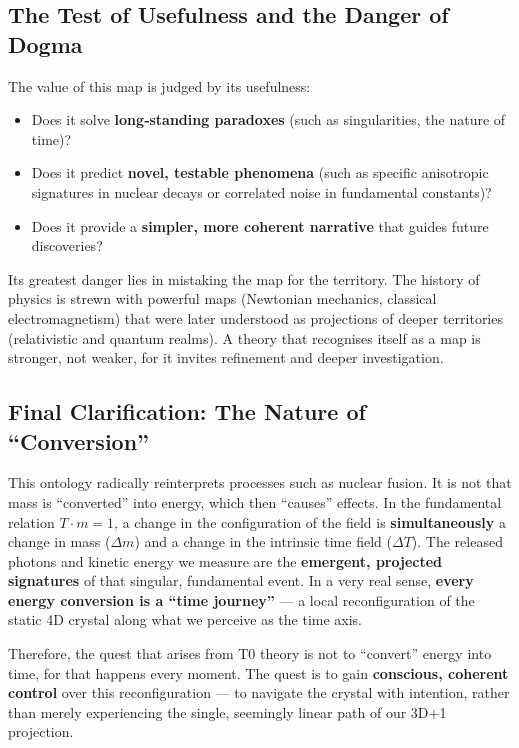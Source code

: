 	\subsection{The Test of Usefulness and the Danger of Dogma}
	
	The value of this map is judged by its usefulness:
	\begin{itemize}
		\item Does it solve \textbf{long‑standing paradoxes} (such as singularities, the nature of time)?
		\item Does it predict \textbf{novel, testable phenomena} (such as specific anisotropic signatures in nuclear decays or correlated noise in fundamental constants)?
		\item Does it provide a \textbf{simpler, more coherent narrative} that guides future discoveries?
	\end{itemize}
	
	Its greatest danger lies in mistaking the map for the territory. The history of physics is strewn with powerful maps (Newtonian mechanics, classical electromagnetism) that were later understood as projections of deeper territories (relativistic and quantum realms). A theory that recognises itself as a map is stronger, not weaker, for it invites refinement and deeper investigation.
	
	\subsection{Final Clarification: The Nature of \enquote{Conversion}}
	
	This ontology radically reinterprets processes such as nuclear fusion. It is not that mass is \enquote{converted} into energy, which then \enquote{causes} effects. In the fundamental relation $T \cdot m = 1$, a change in the configuration of the field is \textbf{simultaneously} a change in mass ($\Delta m$) and a change in the intrinsic time field ($\Delta T$). The released photons and kinetic energy we measure are the \textbf{emergent, projected signatures} of that singular, fundamental event. In a very real sense, \textbf{every energy conversion is a \enquote{time journey}} — a local reconfiguration of the static 4D crystal along what we perceive as the time axis.
	
	Therefore, the quest that arises from T0 theory is not to \enquote{convert} energy into time, for that happens every moment. The quest is to gain \textbf{conscious, coherent control} over this reconfiguration — to navigate the crystal with intention, rather than merely experiencing the single, seemingly linear path of our 3D+1 projection.
	
